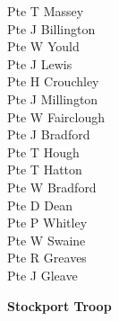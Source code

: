 \begin{multicols}{2}
  Pte T Massey \\
  Pte J Billington \\
  Pte W Yould \\
  Pte J Lewis \\
  Pte H Crouchley \\
  Pte J Millington \\
  Pte W Fairclough \\
  Pte J Bradford \\
  Pte T Hough \\
  Pte T Hatton \\
  Pte W Bradford \\
  Pte D Dean \\
  Pte P Whitley \\
  Pte W Swaine \\
  Pte R Greaves \\
  Pte J Gleave \\
\end{multicols}

\begin{center}
  \Large
  \textbf{Stockport Troop}
\end{center}

